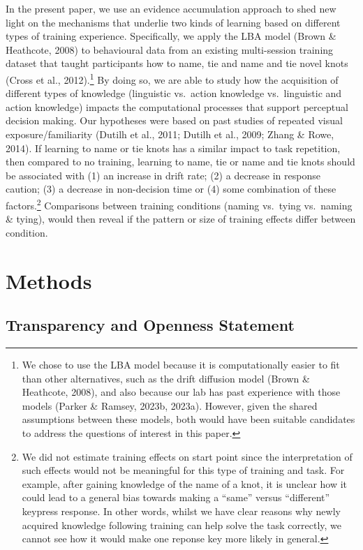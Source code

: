 \documentclass[
  english,
  man, donotrepeattitle,floatsintext]{apa6}
\begin{document}
In the present paper, we use an evidence accumulation approach to shed new light on the mechanisms that underlie two kinds of learning based on different types of training experience. Specifically, we apply the LBA model (Brown \& Heathcote, 2008) to behavioural data from an existing multi-session training dataset that taught participants how to name, tie and name and tie novel knots (Cross et al., 2012).\footnote{We chose to use the LBA model because it is computationally easier to fit than other alternatives, such as the drift diffusion model (Brown \& Heathcote, 2008), and also because our lab has past experience with those models (Parker \& Ramsey, 2023b, 2023a). However, given the shared assumptions between these models, both would have been suitable candidates to address the questions of interest in this paper.} By doing so, we are able to study how the acquisition of different types of knowledge (linguistic vs.~action knowledge vs.~linguistic and action knowledge) impacts the computational processes that support perceptual decision making. Our hypotheses were based on past studies of repeated visual exposure/familiarity (Dutilh et al., 2011; Dutilh et al., 2009; Zhang \& Rowe, 2014). If learning to name or tie knots has a similar impact to task repetition, then compared to no training, learning to name, tie or name and tie knots should be associated with (1) an increase in drift rate; (2) a decrease in response caution; (3) a decrease in non-decision time or (4) some combination of these factors.\footnote{We did not estimate training effects on start point since the interpretation of such effects would not be meaningful for this type of training and task. For example, after gaining knowledge of the name of a knot, it is unclear how it could lead to a general bias towards making a ``same'' versus ``different'' keypress response. In other words, whilst we have clear reasons why newly acquired knowledge following training can help solve the task correctly, we cannot see how it would make one reponse key more likely in general.} Comparisons between training conditions (naming vs.~tying vs.~naming \& tying), would then reveal if the pattern or size of training effects differ between condition.

\section{Methods}\label{methods}

\subsection{Transparency and Openness Statement}\label{transparency-and-openness-statement}
\end{document}

